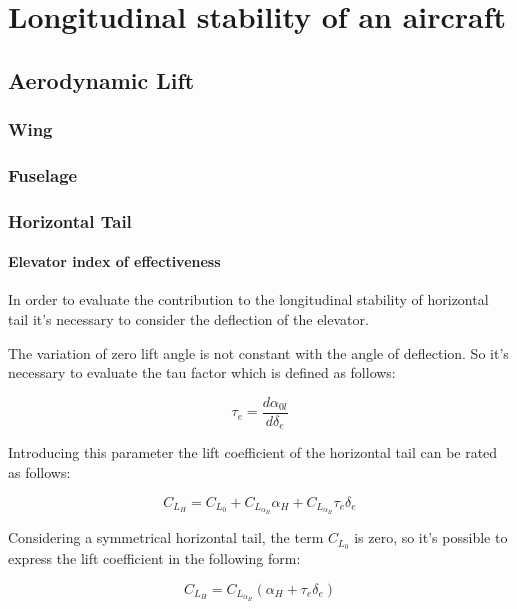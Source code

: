 \chapter{Longitudinal stability of an aircraft}

\section{Aerodynamic Lift}
\subsection{Wing}
\subsection{Fuselage}
\subsection{Horizontal Tail}
\subsubsection{Elevator index of effectiveness}
 In order to evaluate the contribution to the longitudinal stability of horizontal tail it's necessary to consider the deflection of the elevator. 
		
		
The variation of zero lift angle is not constant with the angle of deflection. So it's necessary to evaluate the tau factor which is defined as follows:

\begin{equation}		 
\tau_e = \frac{d \alpha_{0l}}{d \delta_e}
\end{equation}

		
Introducing this parameter the lift coefficient of the horizontal tail can be rated as follows:

\begin{equation}
C_{L_H}= C_{L_0} + C_{L_{{\alpha}_H}} \alpha_H + 	C_{L_{{\alpha}_H}} \tau_e \delta_e
\end{equation}

  
Considering a symmetrical horizontal tail, the term $C_{L_0}$ is zero, so it's possible to express the lift coefficient in the following form:


\begin{equation}
C_{L_H}= C_{L_{{\alpha}_H}} \left ( \alpha_H + \tau_e \delta_e \right)
\end{equation}
  		
